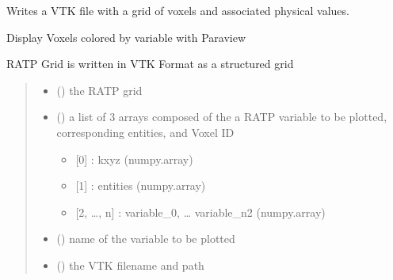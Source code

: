 \documentclass[letterpaper,10pt,english]{sphinxmanual}
\begin{document}

\begin{fulllineitems}
\label{\detokenize{reference:VTK.VTKvoxels}}
\pysigstartsignatures
{}
\pysigstopsignatures
\sphinxAtStartPar
Writes a VTK file with a grid of voxels and associated physical values.

\sphinxAtStartPar
Display Voxels colored by variable with Paraview

\sphinxAtStartPar
RATP Grid is written in VTK Format as a structured grid
\begin{quote}\begin{description}
\begin{itemize}
\item {} 
\sphinxAtStartPar
{} () \textendash{} the RATP grid

\item {} 
\sphinxAtStartPar
{} () \textendash{} 
\sphinxAtStartPar
a list of 3 arrays composed of the a RATP variable to be plotted, corresponding entities, and Voxel ID
\begin{itemize}
\item {} 
\sphinxAtStartPar
{[}0{]} : kxyz (numpy.array)

\item {} 
\sphinxAtStartPar
{[}1{]} : entities (numpy.array)

\item {} 
\sphinxAtStartPar
{[}2, …, n{]} : variable\_0, … variable\_n\sphinxhyphen{}2 (numpy.array)

\end{itemize}


\item {} 
\sphinxAtStartPar
{} () \textendash{} name of the variable to be plotted

\item {} 
\sphinxAtStartPar
{} () \textendash{} the VTK filename and path

\end{itemize}

\end{description}\end{quote}

\end{fulllineitems}
\end{document}
